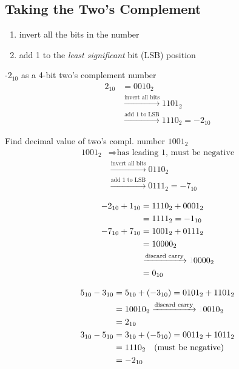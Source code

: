 \documentclass[8pt,a4paper,landscape]{extarticle}
\begin{document}
\begin{multicols*}{3}
\section*{Taking the Two's Complement}
\begin{enumerate}
\item\label{item:2} invert all the bits in the number
\item add 1 to the \emph{least significant} bit (LSB) position
\end{enumerate}
\begin{minipage}{0.48\linewidth}
-2$_{10}$ as a 4-bit two's complement number
\begin{align*}
  2_{10} & = 0010_{2} \\
         & \xrightarrow{\text{invert all bits}} 1101_{2}\\
         & \xrightarrow{\text{add 1 to LSB}} 1110_{2} = -2_{10}
\end{align*}
\end{minipage}
\begin{minipage}{0.5\linewidth}
Find decimal value of two's compl. number $1001_{2}$
\begin{align*}
  1001_{2} & \Rightarrow{\text{has leading 1, must be negative}} \\
           & \xrightarrow{\text{invert all bits}} 0110_{2} \\
           & \xrightarrow{\text{add 1 to LSB}} 0111_{2} = -7_{10}
\end{align*}
\end{minipage}
\begin{minipage}{0.5\linewidth}
\begin{align*}
  -2_{10} + 1_{10} & = 1110_{2} + 0001_{2} \\
                   & = 1111_{2} = -1_{10} \\
  -7_{10} + 7_{10} & = 1001_{2} + 0111_{2} \\
                   & = 10000_{2} \\
                   &\xrightarrow{\text{discard carry}} \dimtxt{1}0000_{2} \\
  & = 0_{10}
\end{align*}
\end{minipage}
\begin{minipage}{0.5\linewidth}
\begin{align*}
  5_{10} - 3_{10} & = 5_{10} + (-3_{10}) = 0101_{2} + 1101_{2} \\
                  & = 10010_{2} \xrightarrow{\text{discard carry}} \dimtxt{1}0010_{2}\\
                  & = 2_{10} \\
  3_{10} - 5_{10} & = 3_{10} + (-5_{10}) = 0011_{2} + 1011_{2} \\
                  & = 1110_{2} \quad (\text{must be negative}) \\
                  & = -2_{10}
\end{align*}
\end{minipage}


\end{multicols*}
\end{document}
